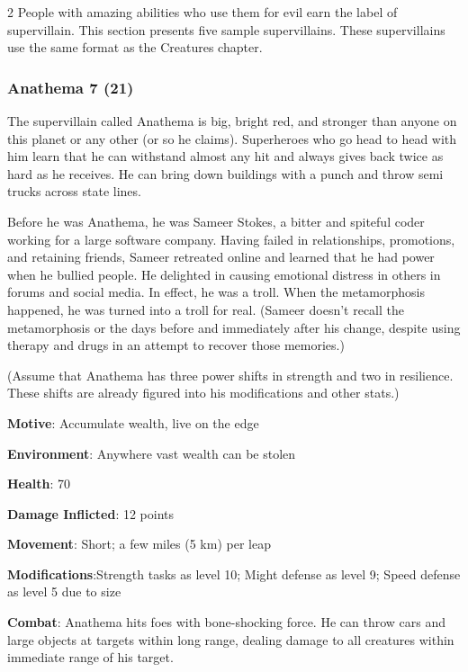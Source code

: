 \begin{multicols}{2}
People with amazing abilities who use them for evil earn the label of supervillain. This section presents five sample supervillains. These supervillains use the same format as the Creatures chapter.

\subsubsection{Anathema	7 (21)}

The supervillain called Anathema is big, bright red, and stronger than anyone on this planet or any other (or so he claims). Superheroes who go head to head with him learn that he can withstand almost any hit and always gives back twice as hard as he receives. He can bring down buildings with a punch and throw semi trucks across state lines. 

Before he was Anathema, he was Sameer Stokes, a bitter and spiteful coder working for a large software company. Having failed in relationships, promotions, and retaining friends, Sameer retreated online and learned that he had power when he bullied people. He delighted in causing emotional distress in others in forums and social media. In effect, he was a troll. When the metamorphosis happened, he was turned into a troll for real. (Sameer doesn’t recall the metamorphosis or the days before and immediately after his change, despite using therapy and drugs in an attempt to recover those memories.)

(Assume that Anathema has three power shifts in strength and two in resilience. These shifts are already figured into his modifications and other stats.)

\textbf{Motive}: Accumulate wealth, live on the edge

\textbf{Environment}: Anywhere vast wealth can be stolen

\textbf{Health}: 70

\textbf{Damage Inflicted}: 12 points

\textbf{Movement}: Short; a few miles (5 km) per leap

\textbf{Modifications}:Strength tasks as level 10; Might defense as level 9; Speed defense as level 5 due to size

\textbf{Combat}: Anathema hits foes with bone-shocking force. He can throw cars and large objects at targets within long range, dealing damage to all creatures within immediate range of his target.


\end{multicols}
